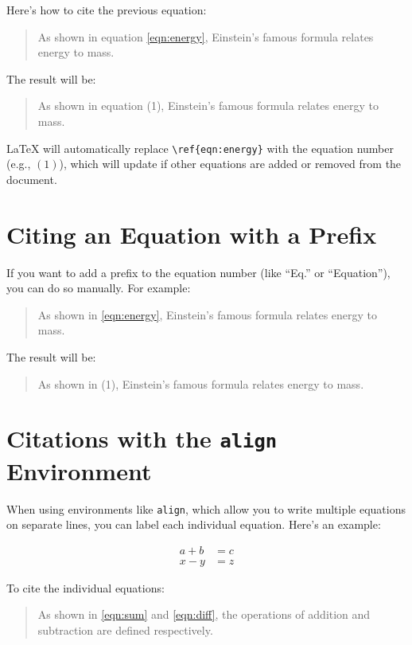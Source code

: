 Here's how to cite the previous equation:

\begin{quote}
    As shown in equation \ref{eqn:energy}, Einstein's famous formula relates energy to mass.
\end{quote}

The result will be:

\begin{quote}
    As shown in equation (1), Einstein's famous formula relates energy to mass.
\end{quote}

LaTeX will automatically replace \verb|\ref{eqn:energy}| with the equation number (e.g., \((1)\)), which will update if other equations are added or removed from the document.

\section{Citing an Equation with a Prefix}

If you want to add a prefix to the equation number (like ``Eq.'' or ``Equation''), you can do so manually. For example:

\begin{quote}
    As shown in  \ref{eqn:energy}, Einstein's famous formula relates energy to mass.
\end{quote}

The result will be:

\begin{quote}
    As shown in  (1), Einstein's famous formula relates energy to mass.
\end{quote}

\section{Citations with the \texttt{align} Environment}

When using environments like \verb|align|, which allow you to write multiple equations on separate lines, you can label each individual equation. Here's an example:

\begin{align}
    a + b &= c \label{eqn:sum} \\
    x - y &= z \label{eqn:diff}
\end{align}

To cite the individual equations:

\begin{quote}
    As shown in \ref{eqn:sum} and \ref{eqn:diff}, the operations of addition and subtraction are defined respectively.
\end{quote}

